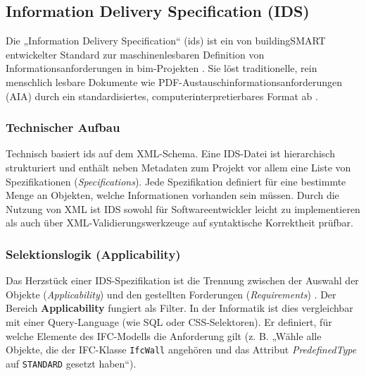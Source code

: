 \subsection{Information Delivery Specification (IDS)}
\label{subsec:ids}
Die „Information Delivery Specification“ (\gls{ids}) ist ein von buildingSMART entwickelter Standard zur maschinenlesbaren Definition von Informationsanforderungen in \gls{bim}-Projekten \cite{eichler2024bimcert, buildingsmartIds}. Sie löst traditionelle, rein menschlich lesbare Dokumente wie PDF-Austauschinformationsanforderungen (AIA) durch ein standardisiertes, computerinterpretierbares Format ab \cite{kladz2025ids}.

\subsubsection{Technischer Aufbau}
Technisch basiert \gls{ids} auf dem XML-Schema. Eine IDS-Datei ist hierarchisch strukturiert und enthält neben Metadaten zum Projekt vor allem eine Liste von Spezifikationen (\textit{Specifications}). Jede Spezifikation definiert für eine bestimmte Menge an Objekten, welche Informationen vorhanden sein müssen. Durch die Nutzung von XML ist IDS sowohl für Softwareentwickler leicht zu implementieren als auch über XML-Validierungswerkzeuge auf syntaktische Korrektheit prüfbar.

\subsubsection{Selektionslogik (Applicability)}
Das Herzstück einer IDS-Spezifikation ist die Trennung zwischen der Auswahl der Objekte (\textit{Applicability}) und den gestellten Forderungen (\textit{Requirements}) \cite{eichler2024bimcert}.
Der Bereich \textbf{Applicability} fungiert als Filter. In der Informatik ist dies vergleichbar mit einer Query-Language (wie SQL oder CSS-Selektoren). Er definiert, für welche Elemente des IFC-Modells die Anforderung gilt (z. B. „Wähle alle Objekte, die der IFC-Klasse \texttt{IfcWall} angehören und das Attribut \textit{PredefinedType} auf \texttt{STANDARD} gesetzt haben“).

